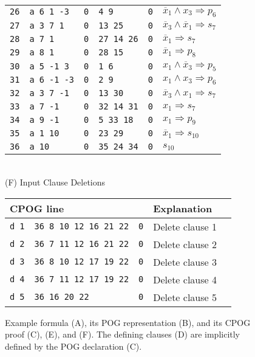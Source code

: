 \documentclass[twoside,11pt]{article}
\newcommand{\obar}[1]{\overline{#1}}
\newcommand{\imply}{\Rightarrow}
\newcommand{\rtext}[1]{\textcolor{midred}{\texttt{#1}}}
\begin{document}
\begin{figure}
\begin{minipage}{0.49\textwidth}
\begin{tabular}{llllll}
\rtext{26} & \texttt{a 6 1 -3} & \texttt{0} & \rtext{4 9} & \texttt{0} & $\obar{x}_1 \land x_3 \imply p_6$ \\
\rtext{27} & \texttt{a 3 7 1} & \texttt{0} & \rtext{13 25} & \texttt{0} & $\obar{x}_3 \land \obar{x}_1 \imply s_7$  \\
\rtext{28} & \texttt{a 7 1} & \texttt{0} & \rtext{27 14 26} & \texttt{0} & $\obar{x}_1 \imply s_7$  \\
\rtext{29} & \texttt{a 8 1} & \texttt{0} & \rtext{28 15} & \texttt{0} & $\obar{x}_1 \imply p_8$  \\
\rtext{30} & \texttt{a 5 -1 3} & \texttt{0} & \rtext{1 6} & \texttt{0} & $x_1 \land \obar{x}_3 \imply p_5$ \\
\rtext{31} & \texttt{a 6 -1 -3} & \texttt{0} & \rtext{2 9} & \texttt{0} & $x_1 \land x_3 \imply p_6$ \\
\rtext{32} & \texttt{a 3 7 -1} & \texttt{0} & \rtext{13 30} & \texttt{0} & $\obar{x}_3 \land x_1 \imply s_7$  \\
\rtext{33} & \texttt{a 7 -1} & \texttt{0} & \rtext{32 14 31} & \texttt{0} & $x_1 \imply s_7$  \\
\rtext{34} & \texttt{a 9 -1} & \texttt{0} & \rtext{5 33 18} & \texttt{0} & $x_1 \imply p_9$  \\
\rtext{35} & \texttt{a 1 10} & \texttt{0} & \rtext{23 29} & \texttt{0} & $\obar{x}_1 \imply s_{10}$  \\
\rtext{36} & \texttt{a 10} & \texttt{0} & \rtext{35 24 34} & \texttt{0} & $s_{10}$ \\
\bottomrule
\end{tabular}
\\[1.5ex]
(F) Input Clause Deletions\\[1.2ex]
\begin{tabular}{lllll}
  \toprule
 \multicolumn{3}{l}{CPOG line} & Explanation\\
\midrule
 \texttt{d 1} & \rtext{36 8 10 12 16 21 22} & \texttt{0} & Delete clause 1 \\
 \texttt{d 2} & \rtext{36 7 11 12 16 21 22} & \texttt{0} & Delete clause 2 \\
 \texttt{d 3} & \rtext{36 8 10 12 17 19 22} & \texttt{0} & Delete clause 3 \\
 \texttt{d 4} & \rtext{36 7 11 12 17 19 22} & \texttt{0} & Delete clause 4 \\
 \texttt{d 5} & \rtext{36 16 20 22} & \texttt{0} &  Delete clause 5 \\
\bottomrule
\end{tabular}
\end{minipage}
\caption{Example formula (A), its POG representation (B), and its CPOG proof (C), (E), and (F).  The defining clauses (D) are implicitly
defined by the POG declaration (C).}
\label{fig:eg4:all}
\end{figure}
\end{document}
